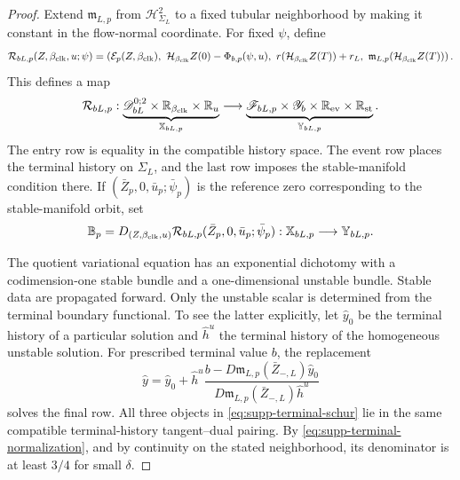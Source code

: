 \begin{proof}
Extend \(\mathfrak m_{L,p}\) from \(\mathscr H_{\Sigma_L}^2\) to a fixed
tubular neighborhood by making it constant in the flow-normal coordinate.
For fixed \(\psi\), define
\begin{equation}
 \mathcal R_{bL,p}(Z,\beta_{\rm clk},u;\psi)
 =\left(
 \mathcal E_p(Z,\beta_{\rm clk}),\
 \mathcal H_{\beta_{\rm clk}} Z(0)-\Phi_{b,p}(\psi,u),\
 r(\mathcal H_{\beta_{\rm clk}} Z(T))+r_L,\
 \mathfrak m_{L,p}(\mathcal H_{\beta_{\rm clk}} Z(T))
 \right).
 \label{eq:supp-mixed-residual}
\end{equation}
This defines a map
\begin{equation}
 \mathcal R_{bL,p}:
 \underbrace{\mathscr D_{bL}^{0;2}\times\mathbb R_{\beta_{\rm clk}}\times\mathbb R_u}
             _{\mathbb X_{bL,p}}
 \longrightarrow
 \underbrace{\mathscr F_{bL,p}\times\mathscr Y_b
             \times\mathbb R_{\rm ev}\times\mathbb R_{\rm st}}
             _{\mathbb Y_{bL,p}}.
 \label{eq:supp-mixed-residual-spaces}
\end{equation}
The entry row is equality in the compatible history space.  The event row
places the terminal history on \(\Sigma_L\), and the last row imposes the
stable-manifold condition there.  If
\((\bar Z_p,0,\bar u_p;\bar\psi_p)\) is the reference zero corresponding to
the stable-manifold orbit, set
\begin{equation}
 \mathbb B_p
 =D_{(Z,\beta_{\rm clk},u)}\mathcal R_{bL,p}
       (\bar Z_p,0,\bar u_p;\bar\psi_p)
 :\mathbb X_{bL,p}\longrightarrow\mathbb Y_{bL,p}.
 \label{eq:supp-mixed-linearization}
\end{equation}

The quotient variational equation has an exponential dichotomy with a
codimension-one stable bundle and a one-dimensional unstable bundle.
Stable data are propagated forward.  Only the unstable scalar is
determined from the terminal boundary functional.  To see the latter
explicitly, let
\(\widehat y_0\) be the terminal history of a particular solution and
\(\widehat h^u\) the terminal history of the homogeneous unstable solution.
For prescribed terminal value \(b\), the replacement
\begin{equation}
 \widehat y=\widehat y_0+\widehat h^u
 \frac{b-D\mathfrak m_{L,p}(\bar Z_{-,L})\widehat y_0}
      {D\mathfrak m_{L,p}(\bar Z_{-,L})\widehat h^u}
 \label{eq:supp-terminal-schur}
\end{equation}
solves the final row.  All three objects in
\cref{eq:supp-terminal-schur} lie in the same compatible terminal-history
tangent--dual pairing.  By \cref{eq:supp-terminal-normalization}, and by
continuity on the stated neighborhood, its denominator is at least
\(3/4\) for small \(\delta\).


\end{proof}
